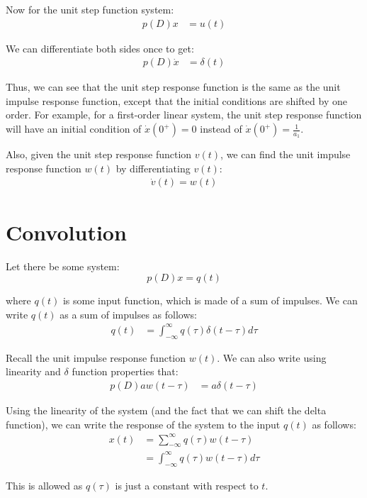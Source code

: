 Now for the unit step function system:
\begin{align*}
p(D) x &= u(t)
\end{align*}

We can differentiate both sides once to get:
\begin{align*}
p(D) \dot{x} &= \delta(t)
\end{align*}

Thus, we can see that the unit step response function is the same as the unit impulse response function, except that the initial conditions are shifted by one order. For example, for a first-order linear system, the unit step response function will have an initial condition of $\dot{x}(0^+) = 0$ instead of $\dot{x}(0^+) = \frac{1}{a_1}$.

Also, given the unit step response function $v(t)$, we can find the unit impulse response function $w(t)$ by differentiating $v(t)$:
\begin{align*}
\boxed{
\dot{v}(t) = w(t)
}
\end{align*}

\section{Convolution}
Let there be some system:
\[
p(D) x = q(t)
\]

where $q(t)$ is some input function, which is made of a sum of impulses. We can write $q(t)$ as a sum of impulses as follows:
\begin{align*}
q(t) &= \int_{-\infty}^{\infty} q(\tau) \delta(t - \tau) d\tau
\end{align*}

Recall the unit impulse response function $w(t)$. We can also write using linearity and $\delta$ function properties that:
\begin{align*}
p(D) a w(t - \tau) &= a \delta(t - \tau)
\end{align*}

Using the linearity of the system (and the fact that we can shift the delta function), we can write the response of the system to the input $q(t)$ as follows:
\begin{align*}
x(t) &= \sum_{-\infty}^{\infty} q(\tau) w(t - \tau) \\
&= \int_{-\infty}^{\infty} q(\tau) w(t - \tau) d\tau
\end{align*}

This is allowed as $q(\tau)$ is just a constant with respect to $t$.

